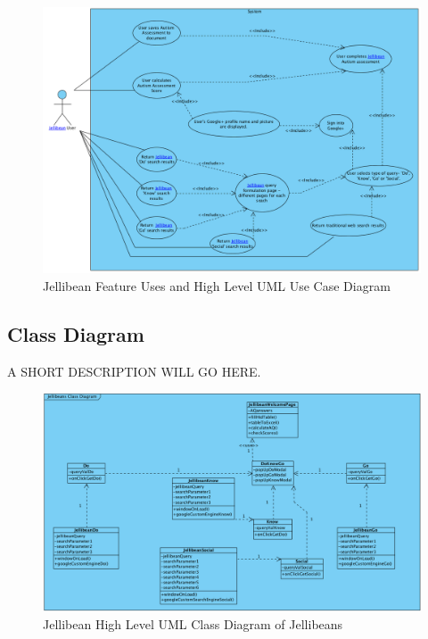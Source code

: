 \documentclass[a4paper, 11pt]{article}
\begin{document}
\begin{figure}[H]
\begin{center}
\includegraphics[scale=0.40]{JBeanUseCase}
\caption{Jellibean Feature Uses and High Level UML Use Case Diagram}
\label{JBeanUseCase}
\end{center}
\end{figure}

\subsection{Class Diagram}

A SHORT DESCRIPTION WILL GO HERE.


\begin{figure}[H]
\begin{center}
\includegraphics[scale=0.35]{jBeanClassDiagram}
\caption{Jellibean High Level UML Class Diagram of Jellibeans}
\label{jBeanClassDiagram}
\end{center}
\end{figure}
\end{document}
